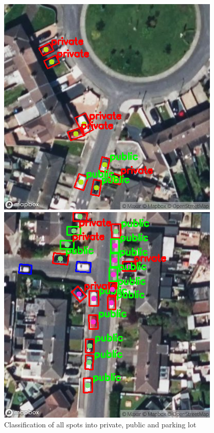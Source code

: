 \begin{figure}[htbp]
\begin{minipage}{0.45\textwidth}
  \end{minipage}
  \hfill
  \begin{minipage}{0.45\textwidth}
    \centering
    \includegraphics[width=\textwidth]{images/classification3.png}
  \end{minipage}
  \hfill
  \begin{minipage}{0.45\textwidth}
    \centering
    \includegraphics[width=\textwidth]{images/classification4.png}
  \end{minipage}
  \caption{Classification of all spots into private, public and parking lot}
  \label{fig:classification_all_spots}
\end{figure}

